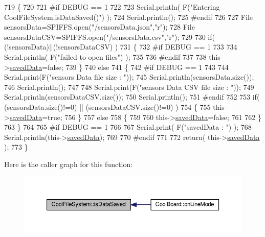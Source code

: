 \begin{DoxyCode}
719 \{
720 
721 \textcolor{preprocessor}{#if DEBUG == 1 }
722 
723     Serial.println( F(\textcolor{stringliteral}{"Entering CoolFileSystem.isDataSaved()"}) );
724     Serial.println();
725 \textcolor{preprocessor}{#endif}
726 
727     File sensorsData=SPIFFS.open(\textcolor{stringliteral}{"/sensorsData.json"},\textcolor{stringliteral}{"r"});
728     File sensorsDataCSV=SPIFFS.open(\textcolor{stringliteral}{"/sensorsData.csv"},\textcolor{stringliteral}{"r"});
729     
730     \textcolor{keywordflow}{if}( (!sensorsData)||(!sensorsDataCSV) ) 
731     \{
732 \textcolor{preprocessor}{    #if DEBUG == 1}
733 
734         Serial.println( F(\textcolor{stringliteral}{"failed to open files"}) );
735 
736 \textcolor{preprocessor}{    #endif}
737         
738         this->\hyperlink{class_cool_file_system_ad398e0c5c41a0c88acdf5d672aa71351}{savedData}=\textcolor{keyword}{false};
739     \}
740     \textcolor{keywordflow}{else}
741     \{       
742 \textcolor{preprocessor}{        #if DEBUG == 1}
743 
744             Serial.print(F(\textcolor{stringliteral}{"sensors Data file size : "}));
745             Serial.println(sensorsData.size());
746             Serial.println();
747             
748             Serial.print(F(\textcolor{stringliteral}{"sensors Data CSV file size : "}));               
749             Serial.println(sensorsDataCSV.size());
750             Serial.println();
751 \textcolor{preprocessor}{        #endif  }
752 
753         \textcolor{keywordflow}{if}( (sensorsData.size()!=0) || (sensorsDataCSV.size()!=0) )
754         \{
755             this->\hyperlink{class_cool_file_system_ad398e0c5c41a0c88acdf5d672aa71351}{savedData}=\textcolor{keyword}{true};
756         \}
757         \textcolor{keywordflow}{else}
758         \{
759 
760             this->\hyperlink{class_cool_file_system_ad398e0c5c41a0c88acdf5d672aa71351}{savedData}=\textcolor{keyword}{false};     
761         
762         \}   
763     \}
764 
765 \textcolor{preprocessor}{#if DEBUG == 1 }
766 
767     Serial.print( F(\textcolor{stringliteral}{"savedData : "}) );
768     Serial.println(this->\hyperlink{class_cool_file_system_ad398e0c5c41a0c88acdf5d672aa71351}{savedData});
769 
770 \textcolor{preprocessor}{#endif}
771 
772     \textcolor{keywordflow}{return}( this->\hyperlink{class_cool_file_system_ad398e0c5c41a0c88acdf5d672aa71351}{savedData} );
773 \}
\end{DoxyCode}
Here is the caller graph for this function\+:\nopagebreak
\begin{figure}[H]
\begin{center}
\leavevmode
\includegraphics[width=350pt]{db/d0c/class_cool_file_system_a5a7eaeea7a9fbf8aaef651d862fa3b5b_icgraph}
\end{center}
\end{figure}
